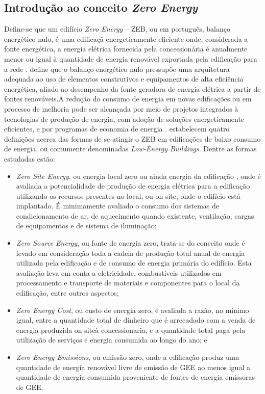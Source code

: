 \subsection{Introdução ao conceito \textit{Zero Energy}}
Define-se que um edifício \textit{Zero Energy} – ZEB, ou em português, balanço energético nulo, é uma edificaçã energeticamente eficiente onde, considerada a fonte energética, a energia elétrica fornecida pela concessionária é anualmente menor ou igual à quantidade de energia renovável exportada pela edificação para a rede \cite{Torcellini2006,U.S.DepartmentofEnergy-USDOE2012,U.S.DepartmentofEnergy-USDOE2015}.\vspace*{0.3cm} \newline
\textcite{Domingos2014} define que o balanço energético nulo pressupõe uma arquitetura adequada ao uso de elementos construtivos e equipamentos de alta eficiência energética, aliado ao desempenho da fonte geradora de energia elétrica a partir de fontes renováveis.\newline A redução do consumo de energia em novas edificações ou em processo de melhoria pode ser alcançada por meio de projetos integrados à tecnologias de produção de energia, com adoção de soluções energeticamente eficientes, e por programas de economia de energia \cite{U.S.DepartmentofEnergy-USDOE2015}.\vspace*{0.3cm} \newline
\textcite{Torcellini2006} estabelecem quatro definições acerca das formas de se atingir o ZEB em edificações de baixo consumo de energia, ou comumente denominadas \textit{Low-Energy Buildings}. Dentre as formas estudadas estão:
    \begin{itemize}
\item \textit{Zero Site Energy}, ou energia local zero ou ainda energia da edificação \cite{U.S.DepartmentofEnergy-USDOE2015}, onde é avaliada a potencialidade de produção de energia elétrica para a edificação utilizando os recursos presentes no local, ou on-site, onde o edifício está implantado. É minimamente avaliado o consumo dos sistemas de condicionamento de ar, de aquecimento quando existente, ventilação, cargas de equipamentos e de sistema de iluminação;
\item \textit{Zero Source Energy}, ou fonte de energia zero, trata-se do conceito onde é levado em consideração toda a cadeia de produção total anual de energia utilizada pela edificação e de consumo de energia primária do edifício. Esta avaliação leva em conta a eletricidade, combustíveis utilizados em processamento e transporte de materiais e componentes para o local da edificação, entre outros aspectos;
\item \textit{Zero Energy Cost}, ou custo de energia zero, é avaliada a razão, no mínimo igual, entre a quantidade total de dinheiro que é arrecadado com a venda de energia produzida on-siteà concessionaria, e a quantidade total paga pela utilização de serviços e energia consumida ao longo do ano; e
\item \textit{Zero Energy Emissions}, ou emissão zero, onde a edificação produz uma quantidade de energia renovável livre de emissão de GEE ao menos igual a quantidade de energia consumida proveniente de fontes de energia emissoras de GEE.
    \end{itemize}
